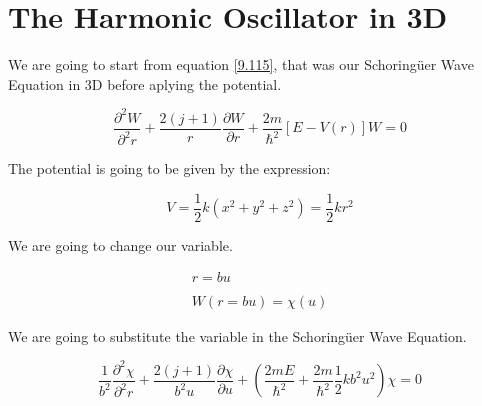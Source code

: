 \setchapterpreamble[u]{\margintoc}
\chapter{The Harmonic Oscillator in 3D}

We are going to start from equation \ref{9.115}, that was our Schoringüer Wave Equation in 3D before aplying the potential.

\begin{equation}
\frac{\partial^2 W}{\partial^2 r}+\frac{2(j+1)}{r}\frac{\partial W}{\partial r} + \frac{2m}{\hbar^2}[E-V(r)]W = 0
\end{equation}

The potential is going to be given by the expression:

\begin{equation}
  V = \frac{1}{2} k (x^2+y^2+z^2) = \frac{1}{2} k r^2
\end{equation}

We are going to change our variable.

\begin{equation}
  \begin{array}{c}
    r=bu
    \\

    \\
    W(r=bu) = \chi(u)
  \end{array}
\end{equation}

We are going to substitute the variable in the Schoringüer Wave Equation.

\begin{equation}
  \frac{1}{b^2}\frac{\partial^2\chi}{\partial^2 r}+ \frac{2(j+1)}{b^2 u}\frac{\partial \chi}{\partial u}+\left(\frac{2mE}{\hbar^2}+\frac{2m}{\hbar^2}\frac{1}{2}kb^2u^2\right)\chi = 0
\end{equation}
